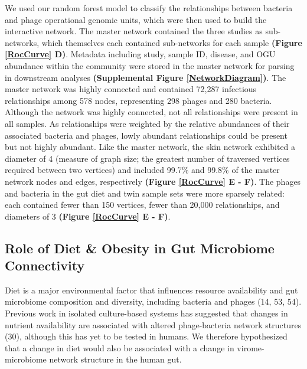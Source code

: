 \documentclass[12pt,]{article}
\begin{document}
We used our random forest model to classify the relationships between
bacteria and phage operational genomic units, which were then used to
build the interactive network. The master network contained the three
studies as sub-networks, which themselves each contained sub-networks
for each sample \textbf{(Figure \ref{RocCurve} D)}. Metadata including
study, sample ID, disease, and OGU abundance within the community were
stored in the master network for parsing in downstream analyses
\textbf{(Supplemental Figure \ref{NetworkDiagram})}. The master network
was highly connected and contained 72,287 infectious relationships among
578 nodes, representing 298 phages and 280 bacteria. Although the
network was highly connected, not all relationships were present in all
samples. As relationships were weighted by the relative abundances of
their associated bacteria and phages, lowly abundant relationships could
be present but not highly abundant. Like the master network, the skin
network exhibited a diameter of 4 (measure of graph size; the greatest
number of traversed vertices required between two vertices) and included
99.7\% and 99.8\% of the master network nodes and edges, respectively
\textbf{(Figure \ref{RocCurve} E - F)}. The phages and bacteria in the
gut diet and twin sample sets were more sparsely related: each contained
fewer than 150 vertices, fewer than 20,000 relationships, and diameters
of 3 \textbf{(Figure \ref{RocCurve} E - F)}.

\subsection{Role of Diet \& Obesity in Gut Microbiome
Connectivity}\label{role-of-diet-obesity-in-gut-microbiome-connectivity}

Diet is a major environmental factor that influences resource
availability and gut microbiome composition and diversity, including
bacteria and phages (14, 53, 54). Previous work in isolated
culture-based systems has suggested that changes in nutrient
availability are associated with altered phage-bacteria network
structures (30), although this has yet to be tested in humans. We
therefore hypothesized that a change in diet would also be associated
with a change in virome-microbiome network structure in the human gut.
\end{document}
